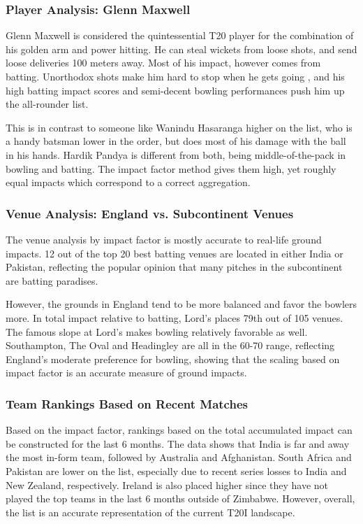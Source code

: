 \documentclass{article}[12pt]
\begin{document}
\subsubsection{Player Analysis: Glenn Maxwell}

Glenn Maxwell is considered the quintessential T20 player for the combination of his golden arm and power hitting. He can steal wickets from loose shots, and send loose deliveries 100 meters away. Most of his impact, however comes from batting. Unorthodox shots make him hard to stop when he gets going \parencite{espn_2023_afghanistan}, and his high batting impact scores and semi-decent bowling performances push him up the all-rounder list.

This is in contrast to someone like Wanindu Hasaranga higher on the list, who is a handy batsman lower in the order, but does most of his damage with the ball in his hands. Hardik Pandya is different from both, being middle-of-the-pack in bowling and batting. The impact factor method gives them high, yet roughly equal impacts which correspond to a correct aggregation.

\subsubsection{Venue Analysis: England vs. Subcontinent Venues}

The venue analysis by impact factor is mostly accurate to real-life ground impacts. 12 out of the top 20 best batting venues are located in either India or Pakistan, reflecting the popular opinion that many pitches in the subcontinent are batting paradises.

However, the grounds in England tend to be more balanced and favor the bowlers more. In total impact relative to batting, Lord's places 79th out of 105 venues. The famous slope at Lord's makes bowling relatively favorable as well. Southampton, The Oval and Headingley are all in the 60-70 range, reflecting England's moderate preference for bowling, showing that the scaling based on impact factor is an accurate measure of ground impacts.

\subsubsection{Team Rankings Based on Recent Matches}

Based on the impact factor, rankings based on the total accumulated impact can be constructed for the last 6 months. The data shows that India is far and away the most in-form team, followed by Australia and Afghanistan. South Africa and Pakistan are lower on the list, especially due to recent series losses to India and New Zealand, respectively. Ireland is also placed higher since they have not played the top teams in the last 6 months outside of Zimbabwe. However, overall, the list is an accurate representation of the current T20I landscape. 
\end{document}
